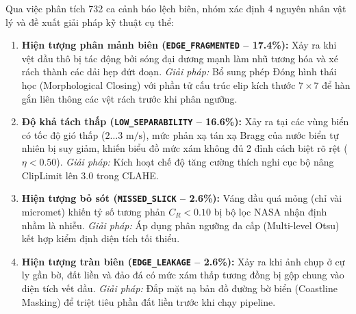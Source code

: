 Qua việc phân tích 732 ca cảnh báo lệch biên, nhóm xác định 4 nguyên nhân vật lý và đề xuất giải pháp kỹ thuật cụ thể:
\begin{enumerate}
    \item \textbf{Hiện tượng phân mảnh biên (\texttt{EDGE\_FRAGMENTED} -- 17.4\%):} Xảy ra khi vệt dầu thô bị tác động bởi sóng đại dương mạnh làm nhũ tương hóa và xé rách thành các dải hẹp đứt đoạn. \textit{Giải pháp:} Bổ sung phép Đóng hình thái học (Morphological Closing) với phần tử cấu trúc elip kích thước $7 \times 7$ để hàn gắn liên thông các vệt rách trước khi phân ngưỡng.
    \item \textbf{Độ khả tách thấp (\texttt{LOW\_SEPARABILITY} -- 16.6\%):} Xảy ra tại các vùng biển có tốc độ gió thấp ($2 \dots 3\text{ m/s}$), mức phản xạ tán xạ Bragg của nước biển tự nhiên bị suy giảm, khiến biểu đồ mức xám không đủ 2 đỉnh cách biệt rõ rệt ($\eta < 0.50$). \textit{Giải pháp:} Kích hoạt chế độ tăng cường thích nghi cục bộ nâng ClipLimit lên $3.0$ trong CLAHE.
    \item \textbf{Hiện tượng bỏ sót (\texttt{MISSED\_SLICK} -- 2.6\%):} Váng dầu quá mỏng (chỉ vài micromet) khiến tỷ số tương phản $C_R < 0.10$ bị bộ lọc NASA nhận định nhầm là nhiễu. \textit{Giải pháp:} Áp dụng phân ngưỡng đa cấp (Multi-level Otsu) kết hợp kiểm định diện tích tối thiểu.
    \item \textbf{Hiện tượng tràn biên (\texttt{EDGE\_LEAKAGE} -- 2.6\%):} Xảy ra khi ảnh chụp ở cự ly gần bờ, đất liền và đảo đá có mức xám thấp tương đồng bị gộp chung vào diện tích vết dầu. \textit{Giải pháp:} Đắp mặt nạ bản đồ đường bờ biển (Coastline Masking) để triệt tiêu phần đất liền trước khi chạy pipeline.
\end{enumerate}
